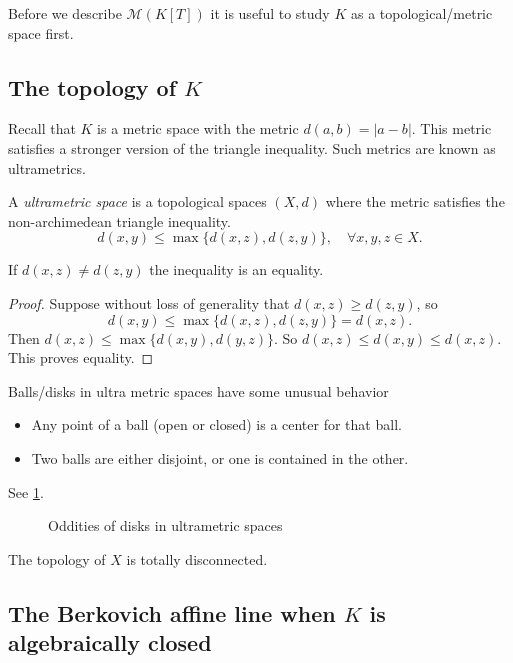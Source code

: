 Before we describe $\mathcal{M} (K[T])$ it is useful to study $K$ as a topological/metric space first.
\subsection{The topology of $K$} \label{sec:ultrametric_spaces}

Recall that $K$ is a metric space with the metric $d(a, b) = |a - b|$. 
This metric satisfies a stronger version of the triangle inequality. 
Such metrics are known as ultrametrics. 
\begin{definition}
	A \emph{ultrametric space} is a topological spaces $(X, d)$ where the metric satisfies the non-archimedean triangle inequality. 
	\[
		d(x, y) \le \max \{d(x, z) ,d(z, y)\}, \quad \forall x, y ,z \in X
	.\] 
\end{definition}
\begin{lemma}
	If $d(x,z) \ne d(z,y)$ the inequality is an equality. 
\end{lemma}
\begin{proof}
	Suppose without loss of generality that $d(x, z) \ge d(z,y)$, so 
	\[	
		d(x, y) \le \max \{d(x, z), d(z,y)\} = d(x, z)
	.\] 
	Then $d(x, z) \le \max \{d(x, y), d(y,z)\}$. So $d(x, z) \le d(x, y) \le d(x, z)$. This proves equality.
\end{proof}
\begin{corollary}
	Balls/disks in ultra metric spaces have some unusual behavior
	\begin{itemize}
		\item Any point of a ball (open or closed) is a center for that ball. 
		\item Two balls are either disjoint, or one is contained in the other.  
	\end{itemize}
	See \cref{fig:oddities_of_ultrametric_balls}.
\end{corollary}
\begin{figure}[h]
    \centering
    \caption{Oddities of disks in ultrametric spaces}
    \label{fig:oddities_of_ultrametric_balls}
\end{figure}
\begin{corollary}
	The topology of $X$ is totally disconnected. 
\end{corollary}

\subsection{The Berkovich affine line when $K$ is algebraically closed} \label{sec:the_berkovich_affine_line_K_alg_closed}

